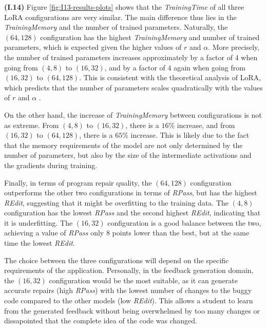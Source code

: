 \documentclass{article}
\begin{document}

\textbf{(I.14)} Figure \ref{fig:I13-results-plots} shows that the \emph{TrainingTime} of all three LoRA configurations are very similar. The main difference thus lies in the \emph{TrainingMemory} and the number of trained parameters. Naturally, the $(64, 128)$ configuration has the highest \emph{TrainingMemory} and number of trained parameters, which is expected given the higher values of $r$ and $\alpha$. More precisely, the number of trained parameters increases approximately by a factor of $4$ when going from $(4, 8)$ to $(16, 32)$, and by a factor of $4$ again when going from $(16, 32)$ to $(64, 128)$. This is consistent with the theoretical analysis of LoRA, which predicts that the number of parameters scales quadratically with the values of $r$ and $\alpha$ \cite{LoRA2021}. 

On the other hand, the increase of \emph{TrainingMemory} between configurations is not as extreme. From $(4, 8)$ to $(16, 32)$, there is a $16$\% increase, and from $(16, 32)$ to $(64, 128)$, there is a $65$\% increase. This is likely due to the fact that the memory requirements of the model are not only determined by the number of parameters, but also by the size of the intermediate activations and the gradients during training.

Finally, in terms of program repair quality, the $(64, 128)$ configuration outperforms the other two configurations in terms of \emph{RPass}, but has the highest \emph{REdit}, suggesting that it might be overfitting to the training data. The $(4, 8)$ configuration has the lowest \emph{RPass} and the second highest \emph{REdit}, indicating that it is underfitting. The $(16, 32)$ configuration is a good balance between the two, achieving a value of \emph{RPass} only 8 points lower than the best, but at the same time the lowest \emph{REdit}. 

The choice between the three configurations will depend on the specific requirements of the application. Personally, in the feedback generation domain, the $(16, 32)$ configuration would be the most suitable, as it can generate accurate repairs (high \emph{RPass}) with the lowest number of changes to the buggy code compared to the other models (low \emph{REdit}). This allows a student to learn from the generated feedback without being overwhelmed by too many changes or dissapointed that the complete idea of the code was changed.
\end{document}
